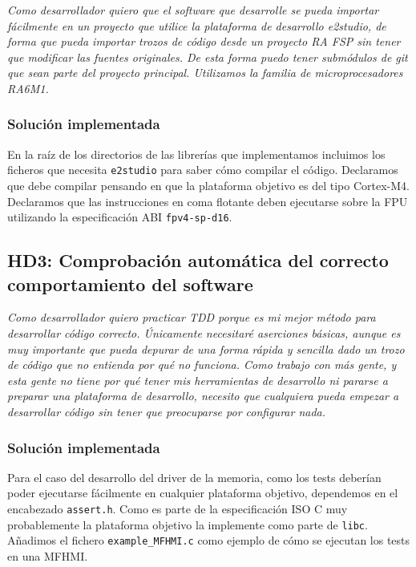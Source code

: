 \textit{Como desarrollador quiero que el software que desarrolle
se pueda importar fácilmente en un proyecto que utilice
la plataforma de desarrollo \textit{e2studio}, de forma que pueda
importar trozos de código desde un proyecto \textit{RA FSP}
sin tener que modificar las fuentes originales. De esta forma puedo
tener submódulos de git que sean parte del proyecto principal.
Utilizamos la familia de microprocesadores RA6M1.}

\subsubsection{Solución implementada}

En la raíz de los directorios de las librerías que implementamos
incluimos los ficheros que necesita \texttt{e2studio} para
saber cómo compilar el código. Declaramos que debe compilar
pensando en que la plataforma objetivo es del tipo Cortex-M4.
Declaramos que las instrucciones en coma flotante deben ejecutarse
sobre la FPU utilizando la especificación ABI \texttt{fpv4-sp-d16}.

\subsection{HD3: Comprobación automática del correcto comportamiento del software}

\textit{Como desarrollador quiero practicar TDD porque es mi mejor
método para desarrollar código correcto. Únicamente necesitaré
aserciones básicas, aunque es muy importante que pueda depurar
de una forma rápida y sencilla dado un trozo de código
que no entienda por qué no funciona. Como trabajo con más gente,
y esta gente no tiene por qué tener mis herramientas de desarrollo
ni pararse a preparar una plataforma de desarrollo, necesito que
cualquiera pueda empezar a desarrollar código sin tener que preocuparse
por configurar nada.}

\subsubsection{Solución implementada}

Para el caso del desarrollo del driver de la memoria, como los tests
deberían poder ejecutarse fácilmente en cualquier plataforma objetivo,
dependemos en el encabezado \texttt{assert.h}. Como es parte de la
especificación ISO C muy probablemente la plataforma objetivo
la implemente como parte de \texttt{libc}. Añadimos el fichero
\texttt{example\_MFHMI.c} como ejemplo de cómo se ejecutan los tests
en una MFHMI.

